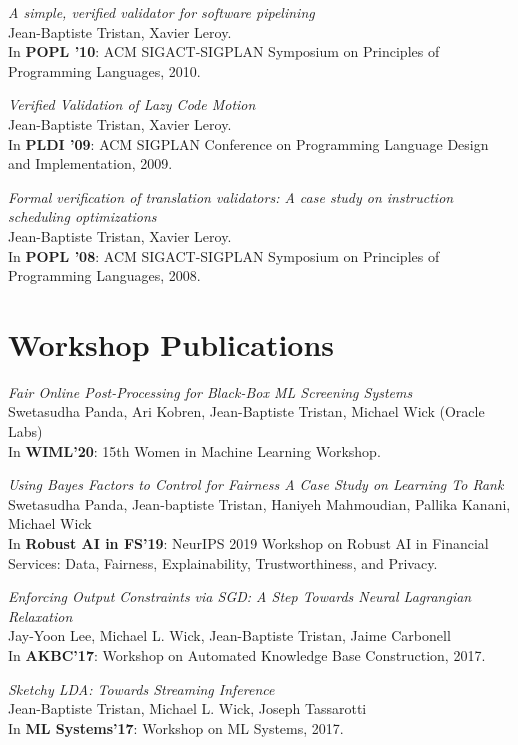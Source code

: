 \documentclass[margin,line]{res}
\begin{document}
\begin{resume}
\emph{A simple, verified validator for software pipelining}\\
Jean-Baptiste Tristan, Xavier Leroy.\\
In {\bf POPL '10}: ACM SIGACT-SIGPLAN Symposium on
Principles of Programming Languages, 2010.

\emph{Verified Validation of Lazy Code Motion}\\
Jean-Baptiste Tristan, Xavier Leroy.\\
In {\bf PLDI '09}: ACM SIGPLAN Conference on Programming
Language Design and Implementation, 2009. 

\emph{Formal verification of translation validators: A case study on instruction scheduling optimizations}\\
Jean-Baptiste Tristan, Xavier Leroy.\\
In {\bf POPL '08}: ACM SIGACT-SIGPLAN Symposium on
Principles of Programming Languages, 2008.

\section{\sc Workshop Publications}

\emph{Fair Online Post-Processing for Black-Box ML Screening Systems}\\
Swetasudha Panda, Ari Kobren, Jean-Baptiste Tristan, Michael Wick (Oracle Labs)\\
In {\bf WIML'20}: 15th Women in Machine Learning Workshop.

\emph{Using Bayes Factors to Control for Fairness A Case Study on Learning To Rank}\\
Swetasudha Panda, Jean-baptiste Tristan, Haniyeh Mahmoudian, Pallika Kanani, Michael Wick\\
In {\bf Robust AI in FS'19}: NeurIPS 2019 Workshop on Robust AI in Financial Services: Data, Fairness, Explainability, Trustworthiness, and Privacy.

\emph{Enforcing Output Constraints via SGD: A Step Towards Neural Lagrangian Relaxation}\\
Jay-Yoon Lee, Michael L. Wick, Jean-Baptiste Tristan, Jaime Carbonell\\
In {\bf AKBC'17}: Workshop on Automated Knowledge Base Construction, 2017.

\emph{Sketchy LDA: Towards Streaming Inference}\\
Jean-Baptiste Tristan, Michael L. Wick, Joseph Tassarotti\\
In {\bf ML Systems'17}: Workshop on ML Systems, 2017.



\end{resume}
\end{document}
